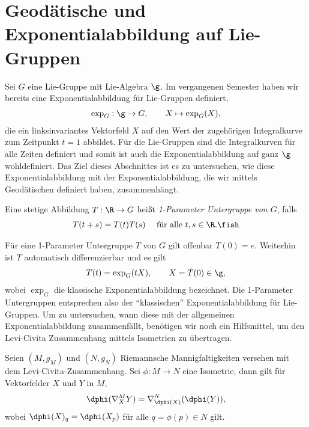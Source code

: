 \documentclass[%
	paper=a5,%
	fleqn,%
	DIV=18,%
	BCOR=0mm,
	fontsize=11pt,
	titlepage=false,%
	bibliography=totoc,
	DIV=18,%
	twoside=true,
	pdftitle=Riemannsche Geometrie,
	pdfauthor=Uwe Semmelmann,
	numbers=noendperiod]%
	{scrbook}
\begin{document}
\section{Geodätische und Exponentialabbildung auf Lie-Gruppen}

Sei $G$ eine Lie-Gruppe mit Lie-Algebra $\g$. Im vergangenen Semester haben wir bereits eine Exponentialabbildung für Lie-Gruppen definiert,
\begin{align*}
\exp_{G}: \g\to G,\qquad X\mapsto \exp_{G}(X),
\end{align*}
die ein linksinvariantes Vektorfeld $X$ auf den Wert der zugehörigen Integralkurve zum Zeitpunkt $t=1$ abbildet. Für die Lie-Gruppen sind die Integralkurven für alle Zeiten definiert und somit ist auch die Exponentialabbildung auf ganz $\g$ wohldefiniert.
Das Ziel dieses Abschnittes ist es zu untersuchen, wie diese Exponentialabbildung mit der Exponentialabbildung, die wir mittels Geodätischen definiert haben, zusammenhängt.

\begin{defn}
Eine stetige Abbildung $T: \R\to G$ heißt \emph{1-Parameter Untergruppe von $G$}, falls
\begin{align*}
T(t+s) = T(t)T(s)\quad\text{ für alle }t,s\in\R.\fish
\end{align*}
\end{defn}

Für eine 1-Parameter Untergruppe $T$ von $G$ gilt offenbar $T(0)=e$. Weiterhin ist $T$ automatisch differenzierbar und es gilt
\begin{align*}
T(t) = \exp_{G}(tX),\qquad X=\dot{T}(0)\in\g,
\end{align*}
wobei $\exp_{G}$ die klassische Exponentialabbildung bezeichnet. Die 1-Parameter Untergruppen entsprechen also der ``klassischen'' Exponentialabbildung für Lie-Gruppen. Um zu untersuchen, wann diese mit der allgemeinen Exponentialabbildung zusammenfällt, benötigen wir noch ein Hilfsmittel, um den Levi-Civita Zusammenhang mittels Isometrien zu übertragen.

\begin{lem}
Seien $(M,g_{M})$ und $(N,g_{N})$ Riemannsche Mannigfaltigkeiten versehen mit dem Levi-Civita-Zusammenhang.
Sei $\phi: M\to N$ eine Isometrie, dann gilt für Vektorfelder $X$ und $Y$ in $M$,
\begin{align*}
\dphi(\nabla_{X}^M Y) = \nabla_{\dphi(X)}^N(\dphi(Y)),
\end{align*}
wobei $\dphi(X)_{q} = \dphi(X_{p})$ für alle $q = \phi(p)\in N$ gilt.\fish
\end{lem}
\end{document}
